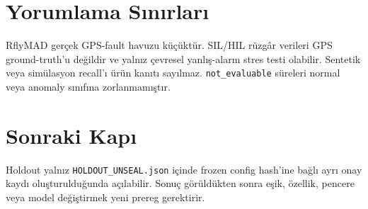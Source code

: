 \documentclass[11pt,a4paper]{article}
\begin{document}
\section{Yorumlama Sınırları}
RflyMAD gerçek GPS-fault havuzu küçüktür. SIL/HIL rüzgâr verileri GPS
ground-truth'u değildir ve yalnız çevresel yanlış-alarm stres testi olabilir.
Sentetik veya simülasyon recall'ı ürün kanıtı sayılmaz. \texttt{not\_evaluable}
süreleri normal veya anomaly sınıfına zorlanmamıştır.

\section{Sonraki Kapı}
Holdout yalnız \texttt{HOLDOUT\_UNSEAL.json} içinde frozen config hash'ine bağlı
ayrı onay kaydı oluşturulduğunda açılabilir. Sonuç görüldükten sonra eşik, özellik,
pencere veya model değiştirmek yeni prereg gerektirir.
\end{document}
